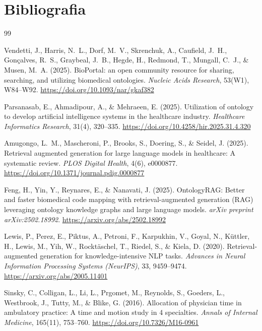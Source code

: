 \documentclass[CAT]{TFUOC}%
\begin{document}
\chapter{Bibliografia}

\begin{thebibliography}{99}

Vendetti, J., Harris, N.~L., Dorf, M.~V., Skrenchuk, A., Caufield, J.~H., Gon\c{c}alves, R.~S., Graybeal, J.~B., Hegde, H., Redmond, T., Mungall, C.~J., \& Musen, M.~A. (2025).
\newblock BioPortal: an open community resource for sharing, searching, and utilizing biomedical ontologies.
\newblock \textit{Nucleic Acids Research}, 53(W1), W84--W92.
\newblock \url{https://doi.org/10.1093/nar/gkaf382}

Parsanasab, E., Ahmadipour, A., \& Mehraeen, E. (2025).
\newblock Utilization of ontology to develop artificial intelligence systems in the healthcare industry.
\newblock \textit{Healthcare Informatics Research}, 31(4), 320--335.
\newblock \url{https://doi.org/10.4258/hir.2025.31.4.320}

Amugongo, L.~M., Mascheroni, P., Brooks, S., Doering, S., \& Seidel, J. (2025).
\newblock Retrieval augmented generation for large language models in healthcare: A systematic review.
\newblock \textit{PLOS Digital Health}, 4(6), e0000877.
\newblock \url{https://doi.org/10.1371/journal.pdig.0000877}

Feng, H., Yin, Y., Reynares, E., \& Nanavati, J. (2025).
\newblock OntologyRAG: Better and faster biomedical code mapping with retrieval-augmented generation (RAG) leveraging ontology knowledge graphs and large language models.
\newblock \textit{arXiv preprint arXiv:2502.18992}.
\newblock \url{https://arxiv.org/abs/2502.18992}

Lewis, P., Perez, E., Piktus, A., Petroni, F., Karpukhin, V., Goyal, N., K\"uttler, H., Lewis, M., Yih, W., Rockt\"aschel, T., Riedel, S., \& Kiela, D. (2020).
\newblock Retrieval-augmented generation for knowledge-intensive NLP tasks.
\newblock \textit{Advances in Neural Information Processing Systems
(NeurIPS)}, 33, 9459--9474.
\newblock \url{https://arxiv.org/abs/2005.11401}

Sinsky, C., Colligan, L., Li, L., Prgomet, M., Reynolds, S., Goeders, L., Westbrook, J., Tutty, M., \& Blike, G. (2016).
\newblock Allocation of physician time in ambulatory practice: A time and motion study in 4 specialties.
\newblock \textit{Annals of Internal Medicine}, 165(11), 753--760.
\newblock \url{https://doi.org/10.7326/M16-0961}


\end{thebibliography}
\end{document}

